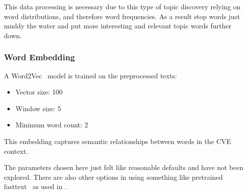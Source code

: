 \documentclass[12pt]{article}
\begin{document}
This data processing is necessary due to this type of topic discovery relying on word distributions,
and therefore word frequencies. As a result stop words just muddy the water and put more interesting
and relevant topic words further down.

\subsubsection*{Word Embedding}

A Word2Vec~\cite{word2vec} model is trained on the preprocessed texts:

\begin{itemize} \item Vector size: 100 \item Window size: 5 \item Minimum word count: 2
\end{itemize}

This embedding captures semantic relationships between words in the CVE context.

The parameters chosen here just felt like reasonable defaults and have not been explored. There are
also other options in using something like pretrained fasttext~\cite{fasttext} as used in
\cite{nvd_clustering_fasttext}.







\end{document}
